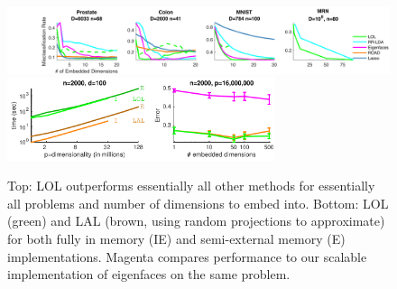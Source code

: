 \documentclass[simplex.tex]{subfiles}
\begin{document}
\begin{figure}[h!]
\begin{cframed}
		\centering
		\includegraphics[width=1.0\textwidth]{../../figs/plot_real}
    \includegraphics[width=0.7\textwidth]{../../figs/scalability}
    \caption{Top: LOL outperforms essentially all other methods for essentially all problems and number of dimensions to embed into.  Bottom: LOL (green) and LAL (brown, using random projections to approximate) for both fully in memory (IE) and semi-external memory (E) implementations.  Magenta compares performance to our scalable implementation of eigenfaces on the same problem.   }
		\label{fig:all}
		\end{cframed}
\end{figure}


\clearpage
\end{document}
